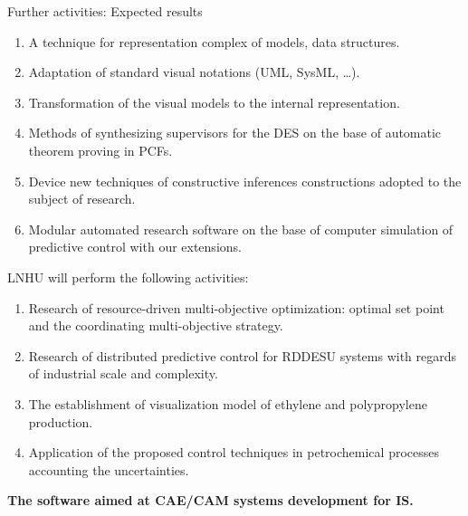 \documentclass[10pt,dvipsnames]{beamer}
\begin{document}
\begin{frame}{Further activities: Expected results}
\begin{enumerate}
\item A technique for representation complex of models, data structures.
\item Adaptation of standard visual notations (UML, SysML, \ldots).
\item Transformation of the visual models to the internal representation.
\item Methods of synthesizing supervisors for the DES on the base of automatic theorem proving in PCFs.
\item Device new techniques of constructive inferences constructions adopted to the subject of research.
\item Modular automated research software on the base of computer simulation of predictive control with our extensions.
\end{enumerate}
LNHU will perform the following activities:
\begin{enumerate}
\item Research of resource-driven multi-objective optimization: optimal set point and the coordinating multi-objective strategy.
\item Research of distributed predictive control for RDDESU systems with regards of industrial scale and complexity.
\item The establishment of visualization model of ethylene and polypropylene production.
\item Application of the proposed control techniques in petrochemical processes accounting the uncertainties.
\end{enumerate}

\noindent\textbf{The software aimed at CAE/CAM systems development for IS.}
\end{frame}
\end{document}
